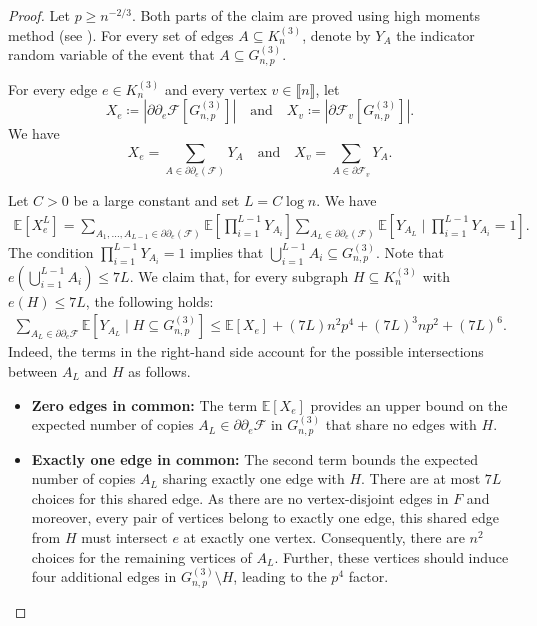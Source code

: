 \documentclass[11pt,a4paper,oneside,reqno]{amsart}
\newcommand{\Gnp}{G_{n, p}^{(3)}}
\newcommand{\cF}{\mathcal{F}}
\newcommand{\1}{\mathbbm{1}} %
\newcommand{\br}[1]{\llbracket{#1}\rrbracket}
\renewcommand{\le}{\leqslant}
\renewcommand{\ge}{\geqslant}
\begin{document}
\begin{proof}
    Let $p \ge n^{-2/3}$. Both parts of the claim are proved using high moments method (see \cite{JanOleRuc04}). For every set of edges $A \subseteq K_n^{(3)}$, denote by $Y_A$ the indicator random variable of the event that $A \subseteq \Gnp$.
    
    For every edge $e \in K_n^{(3)}$ and every vertex $v \in \br{n}$, let
    \[
        X_e \coloneqq \left|\partial \partial_e\cF\left[\Gnp\right]\right| \quad \text{and} \quad X_v \coloneqq \left|\partial \cF_v\left[\Gnp\right]\right|.
    \]
    We have
    \[  
        X_e = \sum_{A \in \partial \partial_e(\cF)} Y_A \quad \text{and} \quad X_v = \sum_{A \in \partial \cF_v} Y_A.
    \]

    Let $C > 0$ be a large constant and set $L = C \log n$. We have
    \begin{align*}
        \mathbb{E}\left[X_e^L\right] = \sum_{A_1, \dots, A_{L-1} \in \partial \partial_e(\cF)} \mathbb{E}\left[\prod_{i=1}^{L-1} Y_{A_i}\right] \sum_{A_L \in \partial \partial_e(\cF)} \mathbb{E}\left[Y_{A_L} \mid \prod_{i=1}^{L-1} Y_{A_i} = 1\right].
    \end{align*}
    The condition $\prod_{i=1}^{L-1} Y_{A_i} = 1$ implies that $\bigcup_{i=1}^{L-1} A_i \subseteq \Gnp$. Note that $e\left( \bigcup_{i=1}^{L-1} A_i \right) \le 7L$. We claim that, for every subgraph $H \subseteq K_n^{(3)}$ with $e(H) \le 7L$, the following holds:
    \begin{align*}
        \sum_{A_L \in \partial \partial_e\cF} \mathbb{E}\left[Y_{A_L} \mid H \subseteq \Gnp\right] \le \mathbb{E}\left[X_e\right] + (7L) n^2 p^4 + (7L)^3 n p^2 + (7L)^6. 
    \end{align*}
    Indeed, the terms in the right-hand side account for the possible intersections between $A_L$ and $H$ as follows.
    \begin{itemize}
        \item \textbf{Zero edges in common:} The term $\mathbb{E}\left[X_e\right]$ provides an upper bound on the expected number of copies $A_L \in \partial \partial_e \cF$ in $\Gnp$ that share no edges with $H$.
        \item \textbf{Exactly one edge in common:} The second term bounds the expected number of copies $A_L$ sharing exactly one edge with $H$.        
        There are at most $7L$ choices for this shared edge. As there are no vertex-disjoint edges in $F$ and moreover, every pair of vertices belong to exactly one edge, this shared edge from $H$ must intersect $e$ at exactly one vertex. Consequently, there are $n^2$ choices for the remaining vertices of $A_L$. Further, these vertices should induce four additional edges in $\Gnp \setminus H$, leading to the $p^4$ factor.
         

\end{itemize}
\end{proof}
\end{document}
